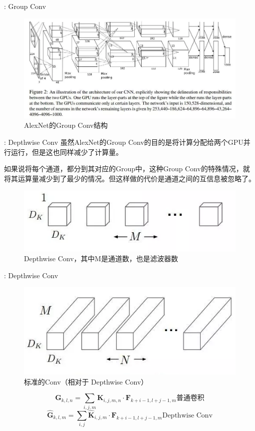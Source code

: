 \documentclass[UTF8, fontset=founder, aspectratio=43, 10pt, t]{ctexbeamer}
\begin{document}
\begin{frame}{\titleprefix: Group Conv}
	\begin{figure}
		\centering
		\includegraphics[width=0.9\linewidth]{Images/groupconv_1}
		\caption{AlexNet的Group Conv结构}
		\label{fig:groupconv1}
	\end{figure}

\end{frame}

\begin{frame}{\titleprefix: Depthwise Conv}
	虽然AlexNet的Group Conv的目的是将计算分配给两个GPU并行运行，但是这也同样减少了计算量。
	
	如果说将每个通道，都分到其对应的Group中，这种Group Conv的特殊情况，就将其运算量减少到了最少的情况。但这样做的代价是通道之间的互信息被忽略了。
	\begin{figure}
		\centering
		\includegraphics[width=0.7\linewidth]{Images/depthwise_1}
		\caption{Depthwise Conv，其中M是通道数，也是滤波器数}
		\label{fig:depthwise1}
	\end{figure}
	
\end{frame}

\begin{frame}{\titleprefix: Depthwise Conv}
	\begin{figure}
		\centering
		\includegraphics[width=0.5\linewidth]{Images/depthwise_2}
		\caption{标准的Conv（相对于 Depthwise Conv）}
		\label{fig:depthwise2}
	\end{figure}
	\[
	\mathbf{G}_{k, l, n}=\sum_{i, j, m} \mathbf{K}_{i, j, m, n} \cdot \mathbf{F}_{k+i-1, l+j-1, m}
	\text{普通卷积}
	\]	
	\[
	\hat{\mathbf{G}}_{k, l, m}=\sum_{i, j} \hat{\mathbf{K}}_{i, j, m} \cdot \mathbf{F}_{k+i-1, l+j-1, m}
	\text{Depthwise Conv}
	\]

\end{frame}
\end{document}
